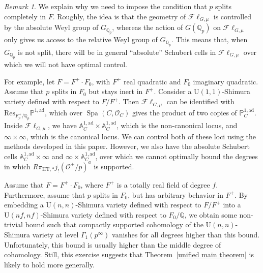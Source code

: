 \documentclass{amsart}
\theoremstyle{remark}
\newtheorem{remark}[subsubsection]{Remark}
\numberwithin{equation}{subsection}
\newcommand{\Q}{\QQ}
\newcommand{\QQ}{{\mathbb Q}}
\newcommand{\cO}{{\mathcal O}}
\DeclareMathOperator{\Spa}{Spa}
\newcommand{\HT}{\mathrm{HT}}
\newcommand{\Fl}{\mathscr{F}\!\ell}
\newcommand{\ad}{\mathrm{ad}}
\renewcommand{\(}{\left(}
\renewcommand{\)}{\right)}
\begin{document}
\begin{remark}\label{explanation for p split} We explain why we need to impose the condition 
that $p$ splits completely in $F$. Roughly, the idea is that the geometry of $\Fl_{G,\mu}$ is 
controlled by the absolute Weyl group of $G_{\Q_p}$, whereas the action of $G(\Q_p)$ on 
$\Fl_{G,\mu}$ only gives us access to the relative Weyl group of $G_{\Q_p}$. This means 
that, when $G_{\Q_p}$ is not split, there will be in general ``absolute'' Schubert cells in 
$\Fl_{G,\mu}$ over which we will not have optimal control. 

For example, let $F=F^+\cdot F_0$, with $F^+$ real quadratic and $F_0$ imaginary quadratic. 
Assume that $p$ splits in $F_0$ but stays inert in $F^+$. Consider a $\mathrm{U}(1,1)$-Shimura variety 
defined with respect to $F/F^+$. Then $\Fl_{G,\mu}$ can be identified with $\mathrm{Res}_{F^+_{p}/\Q_p}\mathbb{P}^{1,\ad}$,
which over $\Spa(C,\cO_C)$ gives the product of two copies of $\mathbb{P}^{1,\ad}_{C}$. Inside $\Fl_{G,\mu}$, 
we have $\mathbb{A}^{1,\ad}_{C}\times \mathbb{A}^{1,\ad}_{C}$, which is the non-canonical locus, and $\infty\times\infty$, which is the canonical locus. 
We can control both of these loci using the methods developed in this paper. However, we also 
have the absolute Schubert cells $\mathbb{A}^{1,\ad}_{C}\times \infty$ and $\infty\times \mathbb{A}^{1,\ad}_{C}$, 
over which we cannot optimally bound the degrees in which $R\pi_{\HT,*}j_{!}(\cO^+/p)^a$ is supported. 

Assume that $F=F^+\cdot F_0$, where $F^+$ is a totally real field of degree $f$. Furthermore, 
assume that $p$ splits in $F_0$, but has arbitrary behavior in $F^+$. By embedding 
a $\mathrm{U}(n,n)$-Shimura variety defined with respect to $F/F^+$ into a $\mathrm{U}(nf, nf)$-Shimura variety 
defined with respect to $F_0/\Q$, we obtain some non-trivial bound such that compactly supported 
cohomology of the $\mathrm{U}(n,n)$-Shimura variety at level $\Gamma_1(p^\infty)$ vanishes for all degrees 
higher than this bound. Unfortunately, this bound is usually higher than the middle degree 
of cohomology. Still, this exercise suggests that Theorem~\ref{unified main theorem} is likely to hold more generally. 
\end{remark}
\end{document}

